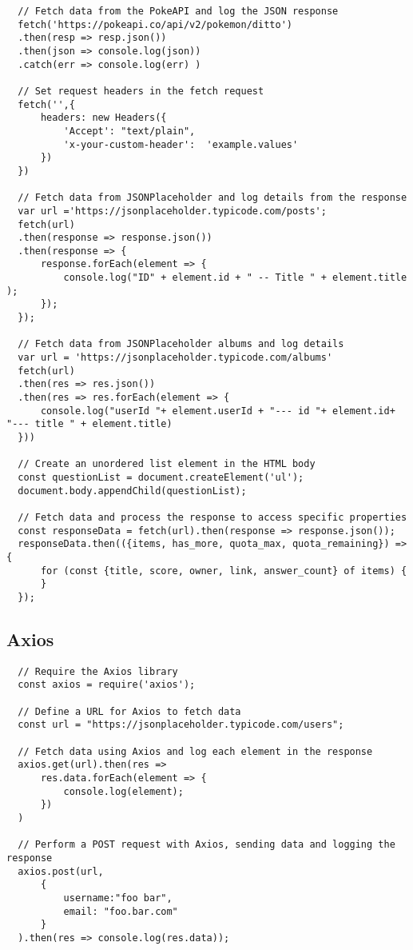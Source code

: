 \documentclass[12pt,a4paper, twosite]{article}
\begin{document}
\begin{verbatim}
  // Fetch data from the PokeAPI and log the JSON response
  fetch('https://pokeapi.co/api/v2/pokemon/ditto')
  .then(resp => resp.json())
  .then(json => console.log(json))
  .catch(err => console.log(err) )

  // Set request headers in the fetch request
  fetch('',{ 
      headers: new Headers({
          'Accept': "text/plain",
          'x-your-custom-header':  'example.values'
      })
  })

  // Fetch data from JSONPlaceholder and log details from the response
  var url ='https://jsonplaceholder.typicode.com/posts';
  fetch(url)
  .then(response => response.json())
  .then(response => {
      response.forEach(element => {
          console.log("ID" + element.id + " -- Title " + element.title );
      });
  });

  // Fetch data from JSONPlaceholder albums and log details
  var url = 'https://jsonplaceholder.typicode.com/albums'
  fetch(url)
  .then(res => res.json())
  .then(res => res.forEach(element => {
      console.log("userId "+ element.userId + "--- id "+ element.id+ "--- title " + element.title)
  }))
  
  // Create an unordered list element in the HTML body
  const questionList = document.createElement('ul');
  document.body.appendChild(questionList);

  // Fetch data and process the response to access specific properties
  const responseData = fetch(url).then(response => response.json());
  responseData.then(({items, has_more, quota_max, quota_remaining}) => {
      for (const {title, score, owner, link, answer_count} of items) {
      }
  });
\end{verbatim}
\newpage

\subsection{Axios}

\begin{verbatim}
  // Require the Axios library
  const axios = require('axios');

  // Define a URL for Axios to fetch data
  const url = "https://jsonplaceholder.typicode.com/users";

  // Fetch data using Axios and log each element in the response
  axios.get(url).then(res =>
      res.data.forEach(element => {
          console.log(element);
      })
  )

  // Perform a POST request with Axios, sending data and logging the response
  axios.post(url,
      {
          username:"foo bar",
          email: "foo.bar.com"
      }
  ).then(res => console.log(res.data));
\end{verbatim}
\end{document}
